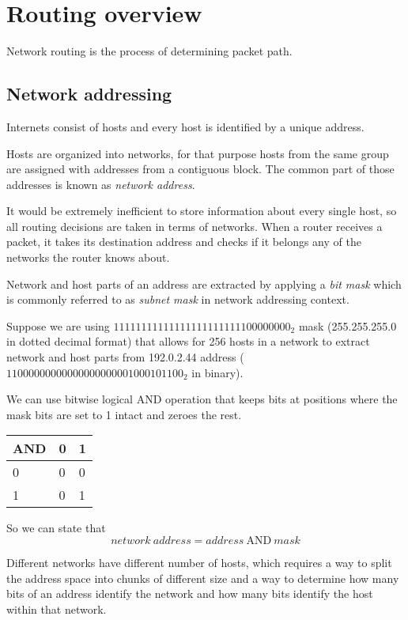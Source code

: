 \chapter{Routing overview}

Network routing is the process of determining packet path.

\section{Network addressing}

Internets consist of hosts and every host is identified by a unique address.

Hosts are organized into networks, for that purpose hosts from the same group are assigned with addresses from a contiguous block.
The common part of those addresses is known as \emph{network address}.

It would be extremely inefficient to store information about every single host, so all routing decisions
are taken in terms of networks. When a router receives a packet, it takes its destination address and
checks if it belongs any of the networks the router knows about.

Network and host parts of an address are extracted by applying a \emph{bit mask} which is commonly referred to as 
\emph{subnet mask} in network addressing context.

Suppose we are using $11111111111111111111111100000000_2$ mask (255.255.255.0 in dotted decimal format) that allows for 256 hosts
in a network to extract network and host parts from 192.0.2.44 address ($11000000000000000000001000101100_2$ in binary).

We can use bitwise logical AND operation that keeps bits at positions where the mask bits are set to 1 intact and zeroes the rest.

\begin{tabular}{|l|l|l|}
\hline
AND & 0 & 1 \\
\hline
0 & 0 & 0 \\
\hline
1 & 0 & 1 \\
\hline
\end{tabular}

So we can state that 
\begin{equation}
  network\ address = address\ \mathrm{AND}\ mask
\end{equation}

Different networks have different number of hosts, which requires a way to split the address space into chunks of
different size and a way to determine how many bits of an address identify the network and how many bits
identify the host within that network.

